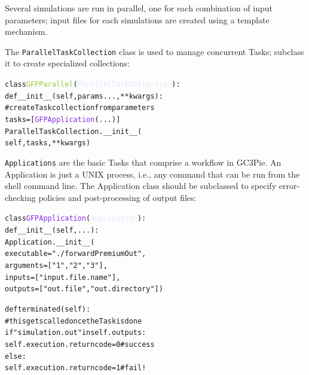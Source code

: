 \documentclass{PoS}
\begin{document}
Several simulations are run in parallel, one for each combination of
input parameters; input files for each simulations are created using a
template mechanism.
 
The \texttt{ParallelTaskCollection} class is used to manage concurrent
Tasks; subclass it to create specialized collections:
 
\begin{center}
  \begin{minipage}{0.5\linewidth}
\begin{alltt}
class \textcolor{YellowGreen}{GFPParallel}(\textcolor{Lavender}{ParallelTaskCollection}):
  def __init__(self, params..., **kwargs):
    # create Task collection from parameters
    tasks = [ \textcolor{BlueViolet}{GFPApplication}(...) ]
    ParallelTaskCollection.__init__(
      self, tasks, **kwargs)
\end{alltt}
    \end{minipage}
  \end{center}

\texttt{Applications} are the basic Tasks that comprise a workflow in
GC3Pie. An Application is just a UNIX process, i.e., any command that
can be run from the shell command line.  The Application class should
be subclassed to specify error-checking policies and post-processing
of output files:

\begin{center}
  \begin{minipage}{0.5\linewidth}
\begin{alltt}
class \textcolor{BlueViolet}{GFPApplication}(\textcolor{Lavender}{Application}):
def __init__(self, ...):
  Application.__init__(
      executable="./forwardPremiumOut",
      arguments=[ "1", "2", "3" ],
      inputs=[ "input.file.name" ],
      outputs=[ "out.file", "out.directory" ])

  def terminated(self):
    # this gets called once the Task is done
    if "simulation.out" in self.outputs:
      self.execution.returncode = 0 # success
    else:
      self.execution.returncode = 1 # fail!
\end{alltt}
  \end{minipage}
\end{center}
\end{document}
